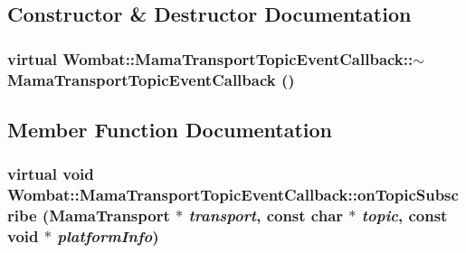 \subsection{Constructor \& Destructor Documentation}
\hypertarget{classWombat_1_1MamaTransportTopicEventCallback_ae2e4aabdbcdeacafb140ebcd340e8a5c}{
\subsubsection[{$\sim$MamaTransportTopicEventCallback}]{\setlength{\rightskip}{0pt plus 5cm}virtual Wombat::MamaTransportTopicEventCallback::$\sim$MamaTransportTopicEventCallback ()}}
\label{classWombat_1_1MamaTransportTopicEventCallback_ae2e4aabdbcdeacafb140ebcd340e8a5c}


\subsection{Member Function Documentation}
\hypertarget{classWombat_1_1MamaTransportTopicEventCallback_af42c672711aee8ee037dc54355253b8a}{
\subsubsection[{onTopicSubscribe}]{\setlength{\rightskip}{0pt plus 5cm}virtual void Wombat::MamaTransportTopicEventCallback::onTopicSubscribe ({\bf MamaTransport} $\ast$ {\em transport}, \/  const char $\ast$ {\em topic}, \/  const void $\ast$ {\em platformInfo})}}
\label{classWombat_1_1MamaTransportTopicEventCallback_af42c672711aee8ee037dc54355253b8a}


